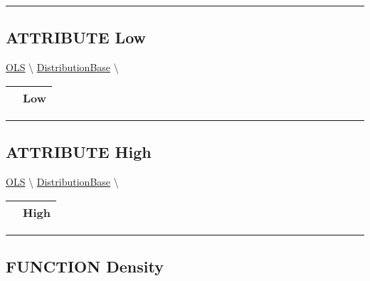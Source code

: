 \rule{\linewidth}{0.5pt}

\subsection*{\textsf{\colorbox{headtoc}{\color{white} ATTRIBUTE}
Low}}

\hypertarget{ecldoc:linearregression.ols.distributionbase.low}{}
\hspace{0pt} \hyperlink{ecldoc:linearregression.ols}{OLS} \textbackslash 
\hspace{0pt} \hyperlink{ecldoc:linearregression.ols.distributionbase}{DistributionBase} \textbackslash 

{\renewcommand{\arraystretch}{1.5}
\begin{tabularx}{\textwidth}{|>{\raggedright\arraybackslash}l|X|}
\hline
\hspace{0pt}\mytexttt{\color{red} } & \textbf{Low} \\
\hline
\end{tabularx}
}

\par


\rule{\linewidth}{0.5pt}
\subsection*{\textsf{\colorbox{headtoc}{\color{white} ATTRIBUTE}
High}}

\hypertarget{ecldoc:linearregression.ols.distributionbase.high}{}
\hspace{0pt} \hyperlink{ecldoc:linearregression.ols}{OLS} \textbackslash 
\hspace{0pt} \hyperlink{ecldoc:linearregression.ols.distributionbase}{DistributionBase} \textbackslash 

{\renewcommand{\arraystretch}{1.5}
\begin{tabularx}{\textwidth}{|>{\raggedright\arraybackslash}l|X|}
\hline
\hspace{0pt}\mytexttt{\color{red} } & \textbf{High} \\
\hline
\end{tabularx}
}

\par


\rule{\linewidth}{0.5pt}
\subsection*{\textsf{\colorbox{headtoc}{\color{white} FUNCTION}
Density}}


